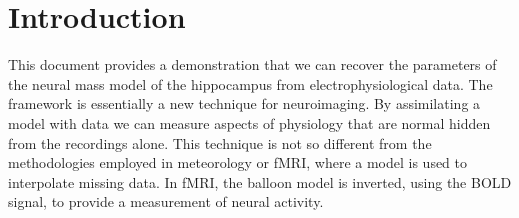 \section{Introduction}\label{sec:introduction}

This document provides a demonstration that we can recover the parameters of the neural mass model of the hippocampus from electrophysiological data. The framework is essentially a new technique for neuroimaging. By assimilating a model with data we can measure aspects of physiology that are normal hidden from the recordings alone. This technique is not so different from the methodologies employed in meteorology or fMRI, where a model is used to interpolate missing data. In fMRI, the balloon model is inverted, using the BOLD signal, to provide a measurement of neural activity.

